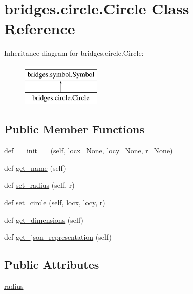 \hypertarget{classbridges_1_1circle_1_1_circle}{}\section{bridges.\+circle.\+Circle Class Reference}
\label{classbridges_1_1circle_1_1_circle}
Inheritance diagram for bridges.\+circle.\+Circle\+:\begin{figure}[H]
\begin{center}
\leavevmode
\includegraphics[height=2.000000cm]{classbridges_1_1circle_1_1_circle}
\end{center}
\end{figure}
\subsection*{Public Member Functions}
\begin{DoxyCompactItemize}
\item 
def \mbox{\hyperlink{classbridges_1_1circle_1_1_circle_a49d5369dc51dd175929c9ccec0eb0dab}{\+\_\+\+\_\+init\+\_\+\+\_\+}} (self, locx=None, locy=None, r=None)
\item 
def \mbox{\hyperlink{classbridges_1_1circle_1_1_circle_acacc4d8cc5f2db86cfcba61f31652003}{get\+\_\+name}} (self)
\item 
def \mbox{\hyperlink{classbridges_1_1circle_1_1_circle_aae91b89fceab6062de1afeaacd78a61d}{set\+\_\+radius}} (self, r)
\item 
def \mbox{\hyperlink{classbridges_1_1circle_1_1_circle_a42b7ccd17017ca328371ce27e1bdbffe}{set\+\_\+circle}} (self, locx, locy, r)
\item 
def \mbox{\hyperlink{classbridges_1_1circle_1_1_circle_a8b6af5d39ec48245f0244a7499082822}{get\+\_\+dimensions}} (self)
\item 
def \mbox{\hyperlink{classbridges_1_1circle_1_1_circle_a7a1be40bcd6028dab0a5bcab6e69c355}{get\+\_\+json\+\_\+representation}} (self)
\end{DoxyCompactItemize}
\subsection*{Public Attributes}
\begin{DoxyCompactItemize}
\item 
\mbox{\hyperlink{classbridges_1_1circle_1_1_circle_ab52ae32c28ea4175b815a7b04491205b}{radius}}
\end{DoxyCompactItemize}
